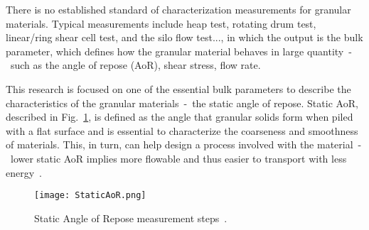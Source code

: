 There is no established standard of characterization measurements for granular materials. Typical measurements include heap test, rotating drum test, linear/ring shear cell test, and the silo flow test..., in which the output is the bulk parameter, which defines how the granular material behaves in large quantity~-~such as the angle of repose (AoR), shear stress, flow rate. 

This research is focused on one of the essential bulk parameters to describe the characteristics of the granular materials~-~the static angle of repose. Static AoR, described in Fig.~\ref{fig:StaticAoR}, is defined as the angle that granular solids form when piled with a flat surface and is essential to characterize the coarseness and smoothness of materials. This, in turn, can help design a process involved with the material~-~lower static AoR implies more flowable and thus easier to transport with less energy~\cite{TEFERRA201945}.

\begin{figure}[H]
    \centering
    \texttt{[image: StaticAoR.png]}
    \caption{Static Angle of Repose measurement steps~\cite{Rackl:2018te}.}\label{fig:StaticAoR}
\end{figure}


